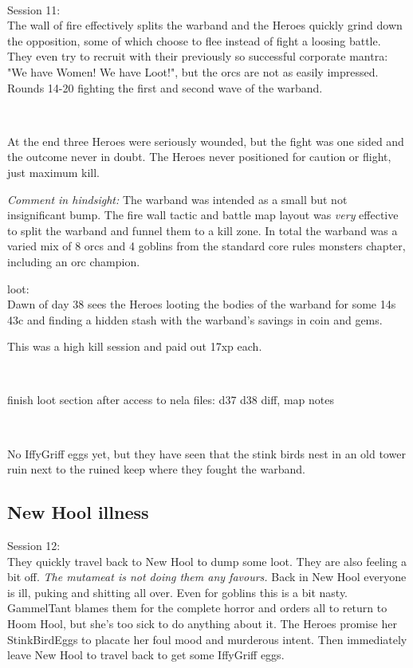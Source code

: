 \

Session 11:\\                                                           %
The wall of fire effectively splits the warband and the Heroes quickly grind down the opposition, some of which choose to flee instead of fight a loosing battle. They even try to recruit with their previously so successful corporate mantra: "We have Women! We have Loot!", but the orcs are not as easily impressed.\\
Rounds 14-20 fighting the first and second wave of the warband.

\

\noindent At the end three Heroes were seriously wounded, but the fight was one sided and the outcome never in doubt. The Heroes never positioned for caution or flight, just maximum kill.

\begin{readoutloud}
\emph{Comment in hindsight:} The warband was intended as a small but not insignificant bump. The fire wall tactic and battle map layout was \emph{very} effective to split the warband and funnel them to a kill zone. In total the warband was a varied mix of 8 orcs and 4 goblins from the standard core rules monsters chapter, including an orc champion.
\end{readoutloud}


loot:\\
Dawn of day 38 sees the Heroes looting the bodies of the warband for some 14s 43c and finding a hidden stash with the warband's savings in coin and gems.

This was a high kill session and paid out 17xp each.

\

\todo finish loot section after access to nela files: d37 d38 diff, map notes

\

No IffyGriff eggs yet, but they have seen that the stink birds nest in an old tower ruin next to the ruined keep where they fought the warband.


\subsection*{New Hool illness}

\forceindent Session 12:\\                                       %
They quickly travel back to New Hool to dump some loot. They are also feeling a bit off. \emph{The mutameat is not doing them any favours.} Back in New Hool everyone is ill, puking and shitting all over. Even for goblins this is a bit nasty. GammelTant blames them for the complete horror and orders all to return to Hoom Hool, but she's too sick to do anything about it. The Heroes promise her StinkBirdEggs to placate her foul mood and murderous intent. Then immediately leave New Hool to travel back to get some IffyGriff eggs.


